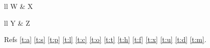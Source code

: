 \documentclass{article}
\begin{document}
\begin{talltblr}[theme=deepfirst, caption={Deepfirst}, label={t:d}]{ll} W & X \\ \end{talltblr}

\begin{talltblr}[theme=cofmacro, caption={Cofmacro}, label={t:m}]{ll} Y & Z \\ \end{talltblr}

Refs \ref{t:a} \ref{t:s} \ref{t:p} \ref{t:l} \ref{t:c} \ref{t:o} \ref{t:t} \ref{t:h} \ref{t:f} \ref{t:x} \ref{t:u} \ref{t:d} \ref{t:m}.
\end{document}
